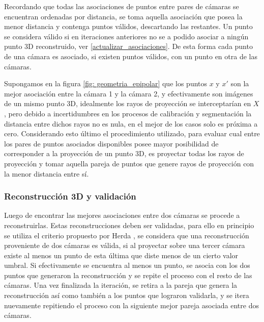 Recordando que todas las asociaciones de puntos entre pares de cámaras se encuentran ordenadas por distancia, se toma aquella asociación que posea la menor distancia y contenga puntos válidos, descartando las restantes. Un punto se considera válido si en iteraciones anteriores no se a podido asociar a ningún punto 3D reconstruido, ver \ref{actualizar_asociaciones}.
De esta forma cada punto de una cámara es asociado, si existen puntos válidos, con un punto en otra de las cámaras.


 Supongamos en la figura \ref{fig: geometria_epipolar} que los puntos $x$ y $x'$ son la mejor asociación entre la cámara 1 y la cámara 2, y efectivamente son imágenes de un mismo punto 3D, idealmente los rayos de proyección se interceptarían en $X$, pero debido a incertidumbres en los procesos de calibración y segmentación la distancia entre dichos rayos no es nula, en el mejor de los casos solo es próxima a cero. 
Considerando esto último el procedimiento utilizado, para evaluar cual entre los pares de puntos asociados disponibles posee mayor posibilidad de corresponder a la proyección de un punto 3D, es proyectar todas los rayos de proyección y tomar aquella pareja de puntos que genere rayos de proyección con la menor distancia entre sí.


\subsubsection{Reconstrucción 3D y validación}


Luego de encontrar las mejores asociaciones entre dos cámaras se procede a reconstruirlas. Estas reconstrucciones deben ser validadas, para ello en principio se utiliza el  criterio propuesto por Herda \cite{herda}, se considera que una reconstrucción proveniente de dos cámaras es válida, si al proyectar sobre una tercer cámara existe al menos un punto de esta última que diste menos de un cierto valor umbral. Si efectivamente se encuentra al menos un punto, se asocia con los dos puntos que generaron la reconstrucción y se repite el proceso con el resto de las cámaras. Una vez finalizada la iteración, se retira a la pareja que genera la reconstrucción así como también a los puntos que lograron validarla, y se itera nuevamente repitiendo el proceso con la siguiente mejor pareja asociada entre dos cámaras.  


